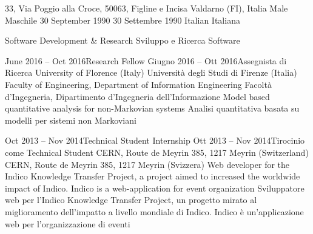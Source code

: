 
\newcommand{\cvLanguage}{english}

\newcommand{\enableCourses}{true}
\newcommand{\enableProjects}{true}
\newcommand{\enableSignature}{false}
\newcommand{\enableURLs}{true}
\newcommand{\enablePublications}{true}




  \begin{europasscv}
    
    \address
      {33, Via Poggio alla Croce, 50063, Figline e Incisa Valdarno (FI), Italy}
      {33, Via Poggio alla Croce, 50063, Figline e Incisa Valdarno (FI), Italia}
    \gender
      {Male}
      {Maschile}
    \dateOfBirth
      {30 September 1990}
      {30 Settembre 1990}
    \nationality
      {Italian}
      {Italiana}
    
    \personalInfo
    
    \jobAppliedFor
      {Software Development \& Research}
      {Sviluppo e Ricerca Software}
    
    \workExperience
      
      \job
      {June 2016 -- Oct 2016}{Research Fellow}
      {Giugno 2016 -- Ott 2016}{Assegnista di Ricerca}
        \jobLocation
          {University of Florence (Italy)}
          {Università degli Studi di Firenze (Italia)}
        \jobDepartment
          {Faculty of Engineering, Department of Information Engineering}
          {Facoltà d'Ingegneria, Dipartimento d'Ingegneria dell'Informazione}
        \jobDescription
          {Model based quantitative analysis for non-Markovian systems}
          {Analisi quantitativa basata su modelli per sistemi non Markoviani}
      
      \job
      {Oct 2013 -- Nov 2014}{Technical Student Internship}
      {Ott 2013 -- Nov 2014}{Tirocinio come Technical Student}
        \jobLocation
          {CERN, Route de Meyrin 385, 1217 Meyrin (Switzerland)}
          {CERN, Route de Meyrin 385, 1217 Meyrin (Svizzera)}
        \jobDescription
          {Web developer for the Indico Knowledge Transfer Project, a project aimed to increased the worldwide impact of Indico. Indico is a web-application for event organization}
          {Sviluppatore web per l'Indico Knowledge Transfer Project, un progetto mirato al miglioramento dell'impatto a livello mondiale di Indico. Indico è un'applicazione web per l'organizzazione di eventi}
    

\end{europasscv}
